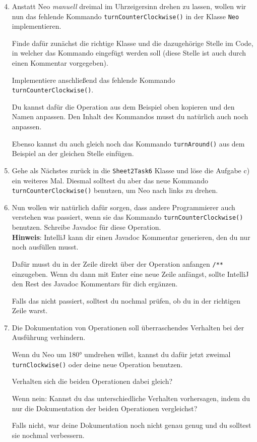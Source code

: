 \begin{enumerate} \setcounter{enumi}{3}
    \item Anstatt Neo \textit{manuell} dreimal im Uhrzeigersinn drehen zu lassen, wollen wir nun das fehlende Kommando \lstinline{turnCounterClockwise()} in der Klasse \lstinline{Neo} implementieren.

    Finde dafür zunächst die richtige Klasse und die dazugehörige Stelle im Code, in welcher das Kommando eingefügt werden soll (diese Stelle ist auch durch einen Kommentar vorgegeben).
    
    Implementiere anschließend das fehlende Kommando \lstinline{turnCounterClockwise()}.
    
    Du kannst dafür die Operation aus dem Beispiel oben kopieren und den Namen anpassen.
    Den Inhalt des Kommandos musst du natürlich auch noch anpassen.
    
    Ebenso kannst du auch gleich noch das Kommando \lstinline{turnAround()} aus dem Beispiel an der gleichen Stelle einfügen.
    
    \item Gehe als Nächstes zurück in die \lstinline{Sheet2Task6} Klasse und löse die Aufgabe c) ein weiteres Mal.
    Diesmal solltest du aber das neue Kommando \lstinline{turnCounterClockwise()} benutzen, um Neo nach links zu drehen.
\end{enumerate}





\begin{enumerate}\setcounter{enumi}{5}
    \item Nun wollen wir natürlich dafür sorgen, dass andere Programmierer auch verstehen was passiert, wenn sie das Kommando \lstinline{turnCounterClockwise()} benutzen.
    Schreibe Javadoc für diese Operation.\\
    
    \textbf{Hinweis}: IntelliJ kann dir einen Javadoc Kommentar generieren, den du nur noch ausfüllen musst.
    
    Dafür musst du in der Zeile direkt über der Operation anfangen \lstinline{/**} einzugeben.
    Wenn du dann mit Enter eine neue Zeile anfängst, sollte IntelliJ den Rest des Javadoc Kommentars für dich ergänzen.
    
    Falls das nicht passiert, solltest du nochmal prüfen, ob du in der richtigen Zeile warst.
    
    \item Die Dokumentation von Operationen soll überraschendes Verhalten bei der Ausführung verhindern.
    
    Wenn du Neo um 180° umdrehen willst, kannst du dafür jetzt zweimal \lstinline{turnClockwise()} oder deine neue Operation benutzen.
    
    Verhalten sich die beiden Operationen dabei gleich?
    
    Wenn nein: Kannst du das unterschiedliche Verhalten vorhersagen, indem du nur die Dokumentation der beiden Operationen vergleichst?
    
    Falls nicht, war deine Dokumentation noch nicht genau genug und du solltest sie nochmal verbessern.
\end{enumerate}


